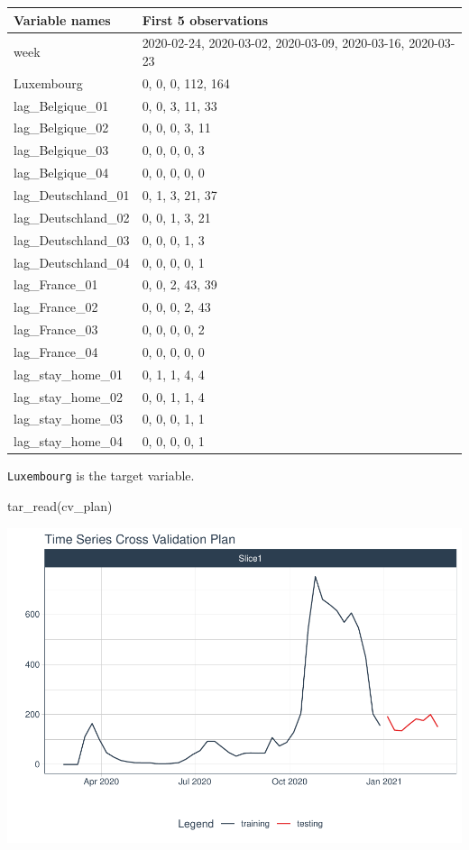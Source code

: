 \documentclass{article}
\newenvironment{Shaded}{\begin{snugshade}}{\end{snugshade}}
\newcommand{\FunctionTok}[1]{\textcolor[rgb]{0.00,0.00,0.00}{#1}}
\newcommand{\NormalTok}[1]{#1}
\begin{document}
\begin{tabular}[t]{ll}
\toprule
Variable names & First 5 observations\\
\midrule
week & 2020-02-24, 2020-03-02, 2020-03-09, 2020-03-16, 2020-03-23\\
Luxembourg & 0,   0,   0, 112, 164\\
lag\_Belgique\_01 & 0,    0,    3,   11,   33\\
lag\_Belgique\_02 & 0,    0,    0,    3,   11\\
lag\_Belgique\_03 & 0,    0,    0,    0,    3\\
\addlinespace
lag\_Belgique\_04 & 0,    0,    0,    0,    0\\
lag\_Deutschland\_01 & 0,   1,   3,  21,  37\\
lag\_Deutschland\_02 & 0,   0,   1,   3,  21\\
lag\_Deutschland\_03 & 0,   0,   0,   1,   3\\
lag\_Deutschland\_04 & 0,   0,   0,   0,   1\\
\addlinespace
lag\_France\_01 & 0,   0,   2,  43,  39\\
lag\_France\_02 & 0,   0,   0,   2,  43\\
lag\_France\_03 & 0,   0,   0,   0,   2\\
lag\_France\_04 & 0,   0,   0,   0,   0\\
lag\_stay\_home\_01 & 0,  1,  1,  4,  4\\
\addlinespace
lag\_stay\_home\_02 & 0,  0,  1,  1,  4\\
lag\_stay\_home\_03 & 0,  0,  0,  1,  1\\
lag\_stay\_home\_04 & 0,  0,  0,  0,  1\\
\bottomrule
\end{tabular}

\texttt{Luxembourg} is the target variable.

\begin{Shaded}
\begin{Highlighting}[]
\FunctionTok{tar\_read}\NormalTok{(cv\_plan)}
\end{Highlighting}
\end{Shaded}

\includegraphics{paper_files/figure-latex/unnamed-chunk-6-1.pdf}
\end{document}
